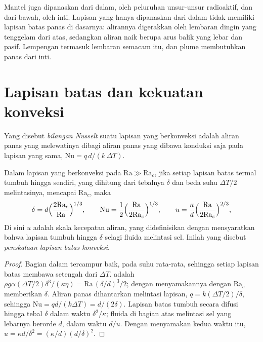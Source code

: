 Mantel juga dipanaskan dari dalam, oleh peluruhan unsur-unsur radioaktif,
dan dari bawah, oleh inti. Lapisan yang hanya dipanaskan dari dalam tidak memiliki
lapisan batas panas di dasarnya: alirannya digerakkan oleh lembaran dingin yang tenggelam dari
atas, sedangkan aliran naik berupa arus balik yang lebar dan pasif. Lempengan termasuk lembaran semacam itu, dan
plume membutuhkan panas dari inti.

\section{Lapisan batas dan kekuatan konveksi}

\begin{definition}\label{def:b3:mantle-convection:nusselt}
Yang disebut \emph{bilangan Nusselt} suatu lapisan yang berkonveksi adalah
aliran panas yang melewatinya dibagi aliran panas yang dibawa konduksi saja
pada lapisan yang sama, $\mathrm{Nu} = q\,d/(k\,\Delta T)$.
\end{definition}

\begin{theorem}\label{thm:b3:mantle-convection:scaling}
Dalam lapisan yang berkonveksi pada $\mathrm{Ra} \gg \mathrm{Ra}_c$, jika setiap lapisan batas termal
tumbuh hingga  sendiri, yang dihitung dari tebalnya
$\delta$ dan beda suhu $\Delta T/2$ melintasinya, mencapai
$\mathrm{Ra}_c$, maka
\[
  \delta = d\Bigl(\frac{2\mathrm{Ra}_c}{\mathrm{Ra}}\Bigr)^{1/3},\qquad
  \mathrm{Nu} = \frac12\Bigl(\frac{\mathrm{Ra}}{2\mathrm{Ra}_c}\Bigr)^{1/3},
  \qquad
  u = \frac\kappa d\Bigl(\frac{\mathrm{Ra}}{2\mathrm{Ra}_c}\Bigr)^{2/3},
\]
Di sini $u$ adalah skala kecepatan aliran, yang didefinisikan dengan mensyaratkan bahwa
lapisan tumbuh hingga $\delta$ selagi fluida melintasi sel.
Inilah yang disebut \emph{penskalaan lapisan batas konveksi}.
\end{theorem}

\begin{proof}
Bagian dalam tercampur baik, pada suhu rata-rata, sehingga setiap lapisan batas
membawa setengah dari $\Delta T$.  adalah $\rho g\alpha(\Delta T/2)
\delta^3/(\kappa\eta) = \mathrm{Ra}\,(\delta/d)^3/2$; dengan menyamakannya dengan
$\mathrm{Ra}_c$ memberikan $\delta$. Aliran panas dihantarkan melintasi lapisan,
$q = k(\Delta T/2)/\delta$, sehingga $\mathrm{Nu} = qd/(k\Delta T) = d/(2\delta)$.
Lapisan batas tumbuh secara difusi hingga tebal $\delta$ dalam waktu
$\delta^2/\kappa$; fluida di bagian atas melintasi sel yang lebarnya berorde
$d$, dalam waktu $d/u$. Dengan menyamakan kedua waktu itu, $u = \kappa d/\delta^2 =
(\kappa/d)(d/\delta)^2$.
\end{proof}

